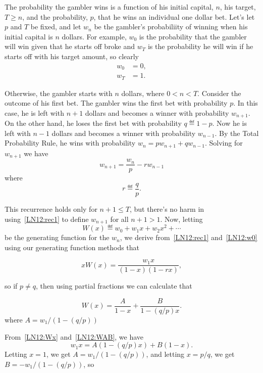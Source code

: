 The probability the gambler wins is a function of his initial capital,
$n$, his target, $T \geq n$, and the probability, $p$, that he wins an
individual one dollar bet.  Let's let $p$ and $T$ be fixed, and let $w_n$
be the gambler's probabiliity of winning when his initial capital is $n$
dollars.  For example, $w_0$ is the probability that the gambler will win
given that he starts off broke and $w_T$ is the probability he will win if
he starts off with his target amount, so clearly
\begin{align}
w_0 & = 0,\label{LN12:w0}\\
w_T & = 1. \label{LN12:wT}
\end{align}

Otherwise, the gambler starts with $n$ dollars, where $0 < n < T$.
Consider the outcome of his first bet.  The gambler wins the first bet
with probability $p$.  In this case, he is left with $n+1$ dollars and
becomes a winner with probability $w_{n+1}$.  On the other hand, he loses
the first bet with probability $q \eqdef 1-p$.  Now he is left with $n-1$
dollars and becomes a winner with probability $w_{n-1}$.  By the Total
Probability Rule, he wins with probability $w_n = p w_{n+1} + q w_{n-1}$.
Solving for $w_{n+1}$ we have
\begin{equation}\label{LN12:rec1}
w_{n+1} = \frac{w_n}{p} -r w_{n-1}
\end{equation}
where
\[
r \eqdef \frac{q}{p}.
\]

This recurrence holds only for $n+1 \leq T$, but there's no harm in
using~\eqref{LN12:rec1} to define $w_{n+1}$ for all $n+1 >1$.  Now, letting
\[
W(x) \eqdef w_0 + w_1x + w_2x^2 + \cdots
\]
be the generating function for the $w_n$, we derive from~\eqref{LN12:rec1}
and~\eqref{LN12:w0} using our generating function methods that

\begin{equation}\label{LN12:Wx}
xW(x) = \frac{w_1x}{(1-x)(1-rx)},
\end{equation}

so if $p \neq q$, then using partial fractions we can calculate that

\begin{editingnotes}
\begin{equation}\label{LN12:WAB}
W(x)= \frac{A}{1-x} + \frac{B}{1-(q/p)x}.
\end{equation}
where $A=w_1/(1-(q/p))$

From~\eqref{LN12:Wx} and~\eqref{LN12:WAB}, we have
\[
w_1x = A(1-(q/p)x) + B(1-x).
\]
Letting $x=1$, we get $A=w_1/(1-(q/p))$, and letting $x=p/q$, we get
$B=-w_1/(1-(q/p))$, so

\end{editingnotes}

